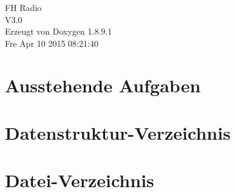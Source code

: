 \documentclass[twoside]{book}
\newcommand{\+}{\discretionary{\mbox{\scriptsize$\hookleftarrow$}}{}{}}
\newcommand{\clearemptydoublepage}{%
  \newpage{\pagestyle{empty}\cleardoublepage}%
}
\begin{document}
\hypersetup{pageanchor=false,
             bookmarks=true,
             bookmarksnumbered=true,
             pdfencoding=unicode
            }
\begin{titlepage}
\vspace*{7cm}
\begin{center}%
{\Large F\+H Radio \\[1ex]\large V3.\+0 }\\
\vspace*{1cm}
{\large Erzeugt von Doxygen 1.8.9.1}\\
\vspace*{0.5cm}
{\small Fre Apr 10 2015 08:21:40}\\
\end{center}
\end{titlepage}
\clearemptydoublepage
\tableofcontents
\clearemptydoublepage
{}
\hypersetup{pageanchor=true}

\chapter{Ausstehende Aufgaben}
\label{todo}
\hypertarget{todo}{}

\chapter{Datenstruktur-\/\+Verzeichnis}

\chapter{Datei-\/\+Verzeichnis}

\end{document}
